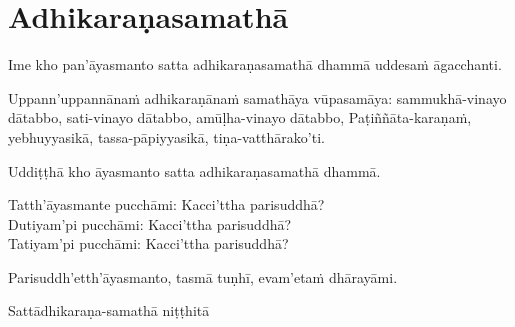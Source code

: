 \section{Adhikaraṇasamathā}
\label{adhi}

\begin{intro}
  Ime kho pan'āyasmanto satta adhikaraṇasamathā dhammā uddesaṁ āgacchanti.
\end{intro}

Uppann'uppannānaṁ adhikaraṇānaṁ samathāya vūpasamāya: sammukhā-vinayo dātabbo, sati-vinayo dātabbo, amūḷha-vinayo dātabbo, Paṭiññāta-karaṇaṁ, yebhuyyasikā, tassa-pāpiyyasikā, tiṇa-vatthārako'ti.

\medskip

\begin{center}
Uddiṭṭhā kho āyasmanto satta adhikaraṇasamathā dhammā.

\smallskip

Tatth'āyasmante pucchāmi: Kacci'ttha parisuddhā?\\
Dutiyam'pi pucchāmi: Kacci'ttha parisuddhā?\\
Tatiyam'pi pucchāmi: Kacci'ttha parisuddhā?

\smallskip

Parisuddh'etth'āyasmanto, tasmā tuṇhī, evam'etaṁ dhārayāmi.
\end{center}

\begin{outro}
  Sattādhikaraṇa-samathā niṭṭhitā
\end{outro}

\clearpage
